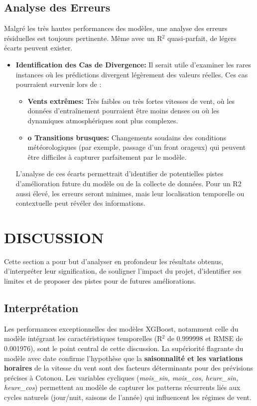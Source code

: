 \documentclass[12pt]{article}
\begin{document}
\subsection{Analyse des Erreurs}
Malgré les très hautes performances des modèles, une analyse des erreurs résiduelles est toujours pertinente. Même avec un R$^2$ quasi-parfait, de légers écarts peuvent exister.
\begin{itemize}[label=$ $]
	\item \textbf{\color{blue}Identification des Cas de Divergence:} Il serait utile d'examiner les rares instances où les prédictions divergent légèrement des valeurs réelles. Ces cas pourraient survenir lors de :
	\begin{itemize}[label=$\color{blue}\circ$]
		\item \textbf{Vents extrêmes:} Très faibles ou très fortes vitesses de vent, où les données d'entraînement pourraient être moins denses ou où les dynamiques atmosphériques sont plus complexes.
		\item \textbf{o	Transitions brusques:} Changements soudains des conditions météorologiques (par exemple, passage d'un front orageux) qui peuvent être difficiles à capturer parfaitement par le modèle.
	\end{itemize}
	L'analyse de ces écarts permettrait d'identifier de potentielles pistes d'amélioration future du modèle ou de la collecte de données. Pour un R2 aussi élevé, les erreurs seront minimes, mais leur localisation temporelle ou contextuelle peut révéler des informations.
\end{itemize}
\section{DISCUSSION}
Cette section a pour but d'analyser en profondeur les résultats obtenus, d'interpréter leur signification, de souligner l'impact du projet, d'identifier ses limites et de proposer des pistes pour de futures améliorations.
\subsection{Interprétation}
Les performances exceptionnelles des modèles XGBoost, notamment celle du modèle intégrant les caractéristiques temporelles (R$^2$ de 0.999998 et RMSE de 0.001976), sont le point central de cette discussion. La supériorité flagrante du modèle avec date confirme l'hypothèse que la \textbf{saisonnalité et les variations horaires} de la vitesse du vent sont des facteurs déterminants pour des prévisions précises à Cotonou. Les variables cycliques (\textit{mois\_sin, mois\_cos, heure\_sin, heure\_cos}) permettent au modèle de capturer les patterns récurrents liés aux cycles naturels (jour/nuit, saisons de l'année) qui influencent les régimes de vent.\\
\end{document}

